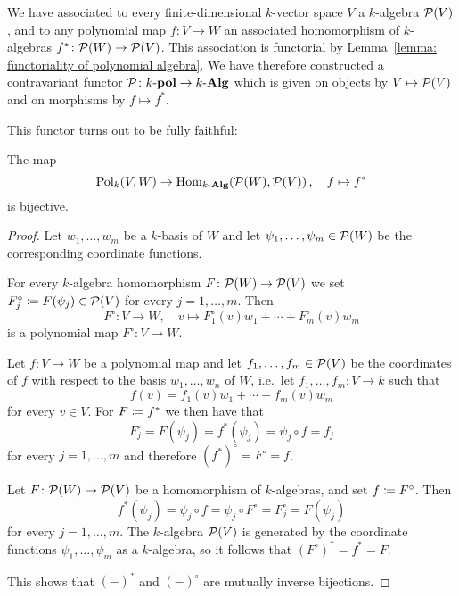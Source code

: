 \begin{fluff}
  \label{fluff: functor P on polynomial vector spaces}
  We have associated to every finite-dimensional $k$-vector space $V$ a $k$-algebra $\mathcal{P}(V)$, and to any polynomial map $f \colon V \to W$ an associated homomorphism of $k$-algebras $f^* \colon \mathcal{P}(W) \to \mathcal{P}(V)$.
  This association is functorial by Lemma~\ref{lemma: functoriality of polynomial algebra}.
  We have therefore constructed a contravariant functor $\mathcal{P} \colon k\text{-}\mathbf{pol} \to k\text{-}\mathbf{Alg}$ which is given on objects by $V \mapsto \mathcal{P}(V)$ and on morphisms by $f \mapsto f^*$.
  
  This functor turns out to be fully faithful:
\end{fluff}


\begin{proposition}
  \label{proposition: P is fully faithful for polynomial vector spaces}
  The map
  \[
            \operatorname{Pol}_k(V,W)
    \to     \operatorname{Hom}_{k\text{-}\mathbf{Alg}}(\mathcal{P}(W), \mathcal{P}(V)) \,,
    \quad   f
    \mapsto f^*
  \]
  is bijective.
\end{proposition}
\begin{proof}
  Let $w_1, \dotsc, w_m$ be a $k$-basis of $W$ and let $\psi_1, \dotsc, \psi_m \in \mathcal{P}(W)$ be the corresponding coordinate functions.
  
  For every $k$-algebra homomorphism $F \colon \mathcal{P}(W) \to \mathcal{P}(V)$ we set $F^\circ_j \coloneqq F(\psi_j) \in \mathcal{P}(V)$ for every $j = 1, \dotsc, m$.
  Then
  \[
            F^\circ
    \colon  V
    \to     W,
    \quad   v
    \mapsto F^\circ_1(v) w_1 + \dotsb + F^\circ_m(v) w_m
  \]
  is a polynomial map $F^\circ \colon V \to W$.
  
  Let $f \colon V \to W$ be a polynomial map and let $f_1, \dotsc, f_m \in \mathcal{P}(V)$ be the coordinates of $f$ with respect to the basis $w_1, \dotsc, w_n$ of $W$, i.e.\ let $f_1, \dotsc, f_m \colon V \to k$ such that
  \[
      f(v)
    = f_1(v) w_1 + \dotsb + f_m(v) w_m
  \]
  for every $v \in V$.
  For $F \coloneqq f^*$ we then have that
  \[
      F^\circ_j
    = F(\psi_j)
    = f^*(\psi_j)
    = \psi_j \circ f
    = f_j
  \]
  for every $j = 1, \dotsc, m$ and therefore $(f^*)^\circ = F^\circ = f$.
  
  Let $F \colon \mathcal{P}(W) \to \mathcal{P}(V)$ be a homomorphism of $k$-algebras, and set $f \coloneqq F^\circ$.
  Then
  \[
      f^*(\psi_j)
    = \psi_j \circ f
    = \psi_j \circ F^\circ
    = F^\circ_j
    = F(\psi_j)
  \]
  for every $j = 1, \dotsc, m$.
  The $k$-algebra $\mathcal{P}(V)$ is generated by the coordinate functions $\psi_1, \dotsc, \psi_m$ as a $k$-algebra, so it follows that $(F^\circ)^* = f^* = F$.
  
  This shows that $(-)^*$ and $(-)^\circ$ are mutually inverse bijections.
\end{proof}


